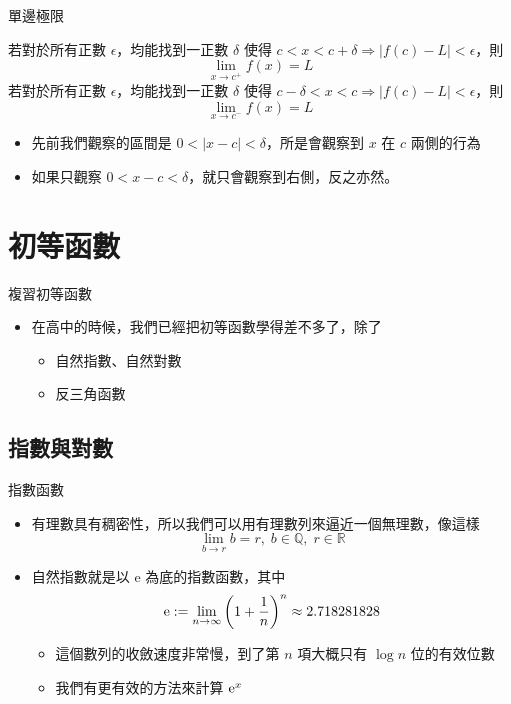 \documentclass{beamer}
\begin{document}
\begin{CJK}{UTF8}{bsmi}
\begin{frame}{單邊極限}
  \begin{definition}
    若對於所有正數 $\epsilon$，均能找到一正數 $\delta$ 使得 $c < x < c + \delta \Rightarrow |f(c) - L| < \epsilon$，則
    \[\lim_{x \to c^+} f(x) = L\]
    若對於所有正數 $\epsilon$，均能找到一正數 $\delta$ 使得 $c - \delta < x < c \Rightarrow |f(c) - L| < \epsilon$，則
    \[\lim_{x \to c^-} f(x) = L\]
  \end{definition}
  \begin{itemize}
    \item 先前我們觀察的區間是 $0 < |x-c| < \delta$，所是會觀察到 $x$ 在 $c$ 兩側的行為
    \item 如果只觀察 $0 < x-c < \delta$，就只會觀察到右側，反之亦然。
  \end{itemize}
\end{frame}

\section{初等函數}
\begin{frame}{複習初等函數}
  \begin{itemize}
    \item 在高中的時候，我們已經把初等函數學得差不多了，除了
      \begin{itemize}
	\item 自然指數、自然對數
	\item 反三角函數
      \end{itemize}
  \end{itemize}
\end{frame}

\subsection{指數與對數}
\begin{frame}{指數函數}
  \begin{itemize}
    \item 有理數具有稠密性，所以我們可以用有理數列來逼近一個無理數，像這樣
    \[\lim_{b \to r} b = r,\; b \in \mathbb Q,\; r \in \mathbb R\]
    \item 自然指數就是以 e 為底的指數函數，其中
    \[\textup e := \lim_{n\to\infty} \left(1 + \frac{1}{n}\right)^n \approx 2.718281828\]
    \begin{itemize}
      \item 這個數列的收斂速度非常慢，到了第 $n$ 項大概只有 $\log n$ 位的有效位數
      \item 我們有更有效的方法來計算 $\textup e^x$
    \end{itemize}
  \end{itemize}
\end{frame}


\end{CJK}
\end{document}
